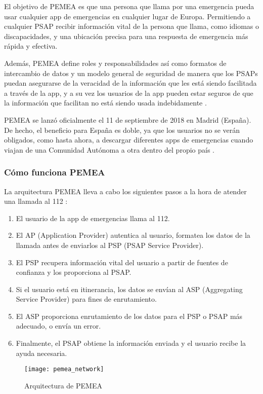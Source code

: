 El objetivo de PEMEA es que una persona que llama por una emergencia pueda usar cualquier app de emergencias en cualquier lugar de Europa. Permitiendo a cualquier PSAP recibir información vital de la persona que llama, como idiomas o discapacidades, y una ubicación precisa para una respuesta de emergencia más rápida y efectiva.

Además, PEMEA define roles y responsabilidades así como formatos de intercambio de datos y un modelo general de seguridad de manera que los PSAPs puedan asegurarse de la veracidad de la información que les está siendo facilitada a través de la app, y a su vez los usuarios de la app pueden estar seguros de que la información que facilitan no está siendo usada indebidamente \cite{pemea3}.

PEMEA se lanzó oficialmente el 11 de septiembre de 2018 en Madrid (España). De hecho, el beneficio para España es doble, ya que los usuarios no se verán obligados, como hasta ahora, a descargar diferentes apps de emergencias cuando viajan de una Comunidad Autónoma a otra dentro del propio país \cite{pemea4}.

\subsubsection{Cómo funciona PEMEA}

La arquitectura PEMEA lleva a cabo los siguientes pasos a la hora de atender una llamada al 112 \cite{pemea1}:

\begin{enumerate}
  \item El usuario de la app de emergencias llama al 112.
  \item El AP (Application Provider) autentica al usuario, formatea los datos de la llamada antes de enviarlos al PSP (PSAP Service Provider).
  \item El PSP recupera información vital del usuario a partir de fuentes de confianza y los proporciona al PSAP.
  \item Si el usuario está en itinerancia, los datos se envían al ASP (Aggregating Service Provider) para fines de enrutamiento.
  \item El ASP proporciona enrutamiento de los datos para el PSP o PSAP más adecuado, o envía un error.
  \item Finalmente, el PSAP obtiene la información enviada y el usuario recibe la ayuda necesaria.
\end{enumerate}

\begin{figure}[htp!]
  \centering
  \texttt{[image: pemea\_network]}
  \caption{Arquitectura de PEMEA}
  \label{fig:pemea_network}
\end{figure}

